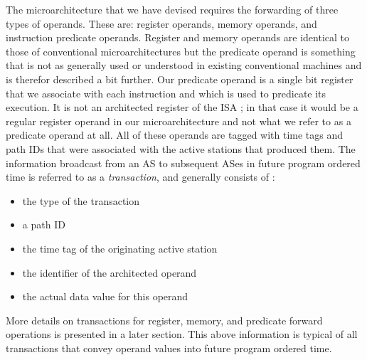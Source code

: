 \documentclass[10pt,dvips]{article}
\begin{document}
The microarchitecture that we have devised requires the
forwarding of three types of operands.  These are:
register operands, memory operands, and instruction predicate operands.
Register and memory operands are identical to those of
conventional microarchitectures but the predicate operand is
something that is not as generally used or understood in
existing conventional machines and is therefor described a bit further.
Our predicate operand is
a single bit register that we associate with each instruction and
which is used to predicate its execution.  It is not an architected
register of the ISA ; 
in that case it would be a regular register operand in our microarchitecture
and not what we refer to as a predicate operand at all.
All of these operands are tagged with time tags 
and path IDs that were associated
with the active stations that produced them.
The information 
broadcast from an AS to subsequent
ASes in future program ordered time is referred
to as a {\em transaction}, and generally consists of :
%
\vspace{-0.05in}
\begin{itemize}
\vspace{-0.1in}
\item{the type of the transaction}
\vspace{-0.1in}
\item{a path ID}
\vspace{-0.1in}
\item{the time tag of the originating active station}
\vspace{-0.1in}
\item{the identifier of the architected operand}
\vspace{-0.1in}
\item{the actual data value for this operand}
\vspace{-0.1in}
\end{itemize}   
%
More details on transactions for register, memory, and
predicate forward operations is presented in a later section.
This above information is typical of all transactions that
convey operand values into future program ordered time.
\end{document}
